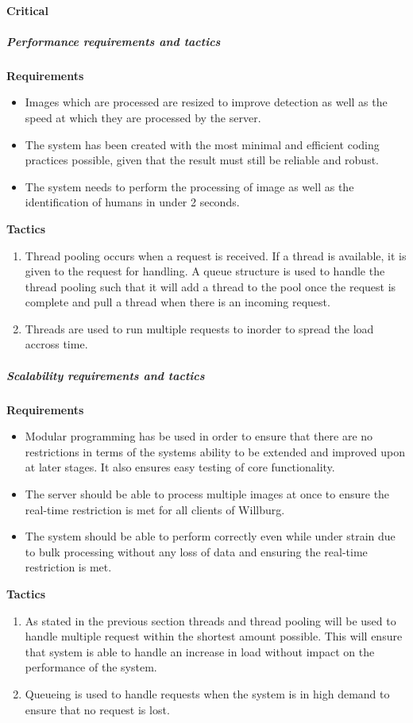 \documentclass[a4paper,12pt]{report}
\begin{document}
	\paragraph {Critical}
		\subparagraph{Performance requirements and tactics}
			\hfill \break
			\hfill \break
			\textbf{Requirements}
			\begin{itemize}
				\item Images which are processed are resized to improve detection as well as the speed at which they are processed by the server.
				\item The system has been created with the most minimal and efficient coding practices possible, given that the result must still be reliable and robust.
				\item The system needs to perform the processing of image as well as the identification of humans in under 2 seconds.
			\end{itemize}
			\hfill \break
			\textbf{Tactics}
				\begin{enumerate}
					\item Thread pooling occurs when a request is received. If a thread is available, it is given to the request for handling. A queue structure is used to handle the thread pooling such that it will add a thread to the pool once the request is complete and pull a thread when there is an incoming request.
					\item Threads are used to run multiple requests to inorder to spread the load accross time.
				\end{enumerate}		
		\subparagraph{Scalability requirements and tactics}
			\hfill \break
			\hfill \break
			\textbf{Requirements}
				\begin{itemize}
					\item Modular programming has be used in order to ensure that there are no restrictions in terms of the systems ability to be extended and improved upon at later stages. It also ensures easy testing of core functionality.
					\item The server should be able to process multiple images at once to ensure the real-time restriction is met for all clients of Willburg.
					\item The system should be able to perform correctly even while under strain due to bulk processing without any loss of data and ensuring the real-time restriction is met.
				\end{itemize}
			\hfill \break
			\newpage	
			\textbf{Tactics}
				\begin{enumerate}
					\item As stated in the previous section threads and thread pooling will be used to handle multiple request within the shortest amount possible. This will ensure that system is able to handle an increase in load without impact on the performance of the system.
					\item Queueing is used to handle requests when the system is in high demand to ensure that no request is lost.
				\end{enumerate}
				
\end{document}
